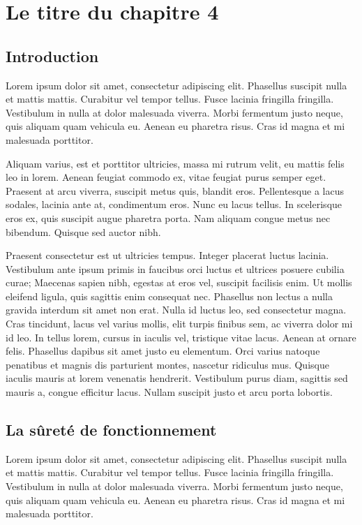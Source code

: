 %
\chapter{Le titre du chapitre 4}
%
\section{Introduction}
Lorem ipsum dolor sit amet, consectetur adipiscing elit. Phasellus suscipit nulla et mattis mattis. Curabitur vel tempor tellus. 
Fusce lacinia fringilla fringilla. Vestibulum in nulla at dolor malesuada viverra. Morbi fermentum justo neque, quis aliquam quam vehicula eu. 
Aenean eu pharetra risus. Cras id magna et mi malesuada porttitor.

Aliquam varius, est et porttitor ultricies, massa mi rutrum velit, eu mattis felis leo in lorem. 
Aenean feugiat commodo ex, vitae feugiat purus semper eget. Praesent at arcu viverra, suscipit metus quis, blandit eros. 
Pellentesque a lacus sodales, lacinia ante at, condimentum eros. Nunc eu lacus tellus. In scelerisque eros ex, quis suscipit augue pharetra porta. 
Nam aliquam congue metus nec bibendum. Quisque sed auctor nibh.

Praesent consectetur est ut ultricies tempus. Integer placerat luctus lacinia. 
Vestibulum ante ipsum primis in faucibus orci luctus et ultrices posuere cubilia curae; Maecenas sapien nibh, egestas at eros vel, suscipit facilisis enim. 
Ut mollis eleifend ligula, quis sagittis enim consequat nec. Phasellus non lectus a nulla gravida interdum sit amet non erat. 
Nulla id luctus leo, sed consectetur magna. Cras tincidunt, lacus vel varius mollis, elit turpis finibus sem, ac viverra dolor mi id leo. 
In tellus lorem, cursus in iaculis vel, tristique vitae lacus. Aenean at ornare felis. Phasellus dapibus sit amet justo eu elementum. 
Orci varius natoque penatibus et magnis dis parturient montes, nascetur ridiculus mus. Quisque iaculis mauris at lorem venenatis hendrerit. 
Vestibulum purus diam, sagittis sed mauris a, congue efficitur lacus. Nullam suscipit justo et arcu porta lobortis.

\section{La sûreté de fonctionnement}
Lorem ipsum dolor sit amet, consectetur adipiscing elit. Phasellus suscipit nulla et mattis mattis. Curabitur vel tempor tellus. 
Fusce lacinia fringilla fringilla. Vestibulum in nulla at dolor malesuada viverra. Morbi fermentum justo neque, quis aliquam quam vehicula eu. 
Aenean eu pharetra risus. Cras id magna et mi malesuada porttitor.


